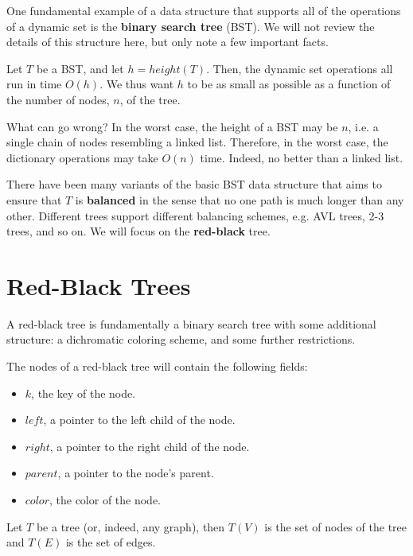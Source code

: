 \documentclass[10pt]{article}
\begin{document}
One fundamental example of a data structure that supports all of the
operations of a dynamic set is the \textbf{binary search tree} (BST). We will
not review the details of this structure here, but only note a few important
facts.

Let $T$ be a BST, and let $h = height(T)$. Then, the dynamic set operations
all run in time $O(h)$. We thus want $h$ to be as small as possible as a
function of the number of nodes, $n$, of the tree.

What can go wrong? In the worst case, the height of a BST may be $n$, i.e. a
single chain of nodes resembling a linked list. Therefore, in the worst case,
the dictionary operations may take $O(n)$ time. Indeed, no better than a linked list.

There have been many variants of the basic BST data structure that aims
to ensure that $T$ is \textbf{balanced} in the sense that no one path is
much longer than any other. Different trees support different balancing schemes,
e.g. AVL trees, 2-3 trees, and so on. We will focus on the \textbf{red-black}
tree.

\section{Red-Black Trees}

A red-black tree is fundamentally a binary search tree with
some additional structure: a dichromatic coloring scheme, and some further
restrictions.

The nodes of a red-black tree will contain
the following fields:
\begin{itemize}
  \item $k$, the key of the node.
  \item $left$, a pointer to the left child of the node.
  \item $right$, a pointer to the right child of the node.
  \item $parent$, a pointer to the node's parent.
  \item $color$, the color of the node.
\end{itemize}

Let $T$ be a tree (or, indeed, any graph), then $T(V)$ is the set of nodes
of the tree and $T(E)$ is the set of edges.
\end{document}
